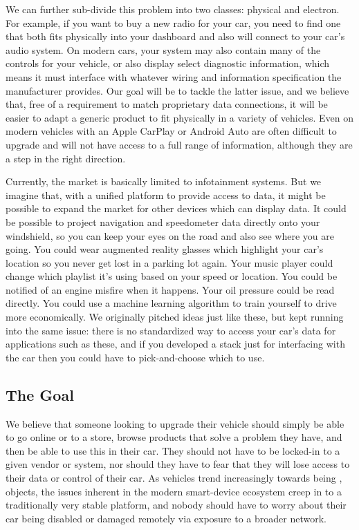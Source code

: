 \documentclass[10pt,letterpaper,unboxed,cm]{article}
\begin{document}
We can further sub-divide this problem into two classes: physical and electron. For example, if you want to buy a new radio for your car, you need to find one that both fits physically into your dashboard and also will connect to your car's audio system. On modern cars, your  system may also contain many of the controls for your vehicle, or also display select diagnostic information, which means it must interface with whatever wiring and information specification the manufacturer provides. Our goal will be to tackle the latter issue, and we believe that, free of a requirement to match proprietary data connections, it will be easier to adapt a generic product to fit physically in a variety of vehicles. Even on modern vehicles with an Apple CarPlay or Android Auto are often difficult to upgrade and will not have access to a full range of information, although they are a step in the right direction.

Currently, the market is basically limited to infotainment systems. But we imagine that, with a unified platform to provide access to data, it might be possible to expand the market for other devices which can display data. It could be possible to project navigation and speedometer data directly onto your windshield, so you can keep your eyes on the road and also see where you are going. You could wear augmented reality glasses which highlight your car's location so you never get lost in a parking lot again. Your music player could change which playlist it's using based on your speed or location. You could be notified of an engine misfire when it happens. Your oil pressure could be read directly. You could use a machine learning algorithm to train yourself to drive more economically. We originally pitched ideas just like these, but kept running into the same issue: there is no standardized way to access your car's data for applications such as these, and if you developed a stack just for interfacing with the car then you could have to pick-and-choose which to use.

\subsection{The Goal}

We believe that someone looking to upgrade their vehicle should simply be able to go online or to a store, browse products that solve a problem they have, and then be able to use this in their car. They should not have to be locked-in to a given vendor or system, nor should they have to fear that they will lose access to their data or control of their car. As vehicles trend increasingly towards being ,  objects, the issues inherent in the modern smart-device ecosystem creep in to a traditionally very stable platform, and nobody should have to worry about their car being disabled or damaged remotely via exposure to a broader network. 
\end{document}
